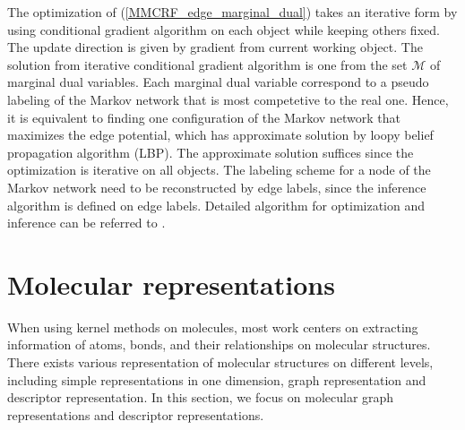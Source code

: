 \documentclass[english]{tktltiki}
\newcommand{\Mcal}{\mathcal{M}}
\newcommand{\argmax}{\textbf{argmax}}
\begin{document}
The optimization of (\ref{MMCRF_edge_marginal_dual}) takes an iterative form by using conditional gradient algorithm on each object while keeping others fixed. The update direction is given by gradient from current working object. The solution from iterative conditional gradient algorithm is one from the set $\Mcal$ of marginal dual variables. Each marginal dual variable correspond to a pseudo labeling of the Markov network that is most competetive to the real one. Hence, it is equivalent to finding one configuration of the Markov network that maximizes the edge potential, which has approximate solution by loopy belief propagation algorithm (LBP). The approximate solution suffices since the optimization is iterative on all objects. The labeling scheme for a node of the Markov network need to be reconstructed by edge labels, since the inference algorithm is defined on edge labels. Detailed algorithm for optimization and inference can be referred to \cite{rousu2007}.

%
%

\clearpage
\section{Molecular representations}
When using kernel methods on molecules, most work centers on extracting information of atoms, bonds, and their relationships on molecular structures. There exists various representation of molecular structures on different levels, including simple representations in one dimension, graph representation and descriptor representation. In this section, we focus on molecular graph representations and descriptor representations.
\end{document}
